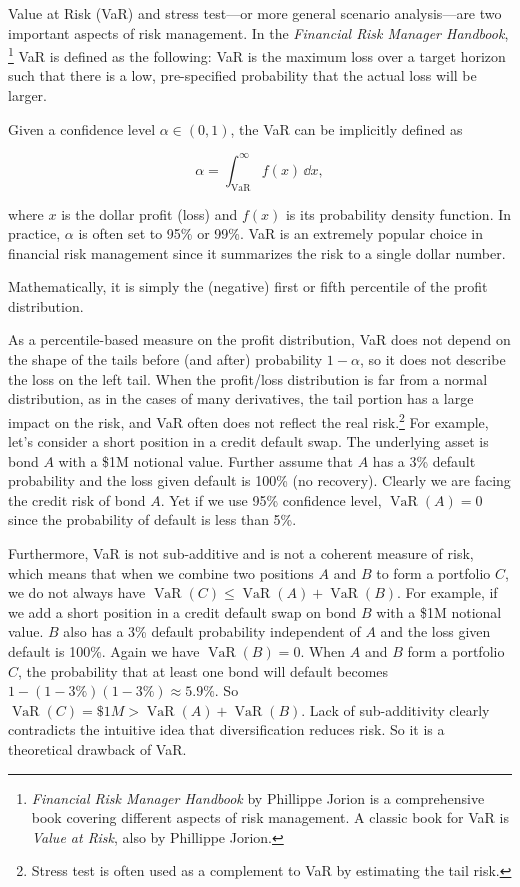\begin{solution}
Value at Risk (VaR) and stress test---or more general scenario analysis---are two
important aspects of risk management. In the \emph{Financial Risk Manager Handbook},
\footnote[14]{\emph{Financial Risk Manager Handbook} by Phillippe Jorion is a comprehensive
book covering different aspects of risk management. A classic book for VaR is \emph{Value
at Risk}, also by Phillippe Jorion.} VaR is defined as the following: VaR is the maximum
loss over a target horizon such that there is a low, pre-specified probability that the
actual loss will be larger.

Given a confidence level $\alpha\in(0,1)$, the VaR can be implicitly defined as

\[
\alpha=\int_{\mathrm{VaR}}^{\infty}f(x)\,\dd x,
\]

where $x$ is the dollar profit (loss) and $f(x)$ is its probability density function. In
practice, $\alpha$ is often set to 95\% or 99\%. VaR is an extremely popular choice in
financial risk management since it summarizes the risk to a single dollar number.


Mathematically, it is simply the (negative) first or fifth percentile of the profit
distribution.

As a percentile-based measure on the profit distribution, VaR does not depend on the
shape of the tails before (and after) probability $1-\alpha$, so it does not describe the
loss on the left tail. When the profit/loss distribution is far from a normal distribution,
as in the cases of many derivatives, the tail portion has a large impact on the risk, and
VaR often does not reflect the real risk.\footnote[15]{Stress test is often used as a
complement to VaR by estimating the tail risk.} For example, let's consider a short
position in a credit default swap. The underlying asset is bond $A$ with a \$1M notional
value. Further assume that $A$ has a 3\% default probability and the loss given default is
100\% (no recovery). Clearly we are facing the credit risk of bond $A$. Yet if we use 95\%
confidence level, $\operatorname{VaR}(A)=0$ since the probability of default is less than 5\%.

Furthermore, VaR is not sub-additive and is not a coherent measure of risk, which means
that when we combine two positions $A$ and $B$ to form a portfolio $C$, we do not always
have $\operatorname{VaR}(C)\leq\operatorname{VaR}(A)+\operatorname{VaR}(B)$. For example, if we add a short position in a credit
default swap on bond $B$ with a \$1M notional value. $B$ also has a 3\% default
probability independent of $A$ and the loss given default is 100\%. Again we have
$\operatorname{VaR}(B)=0$. When $A$ and $B$ form a portfolio $C$, the probability that at least one bond
will default becomes $1-(1-3\%)(1-3\%)\approx5.9\%$. So $\operatorname{VaR}(C)=\$1M>\operatorname{VaR}(A)+\operatorname{VaR}(B)$.
Lack of sub-additivity clearly contradicts the intuitive idea that diversification reduces
risk. So it is a theoretical drawback of VaR.


\end{solution}
